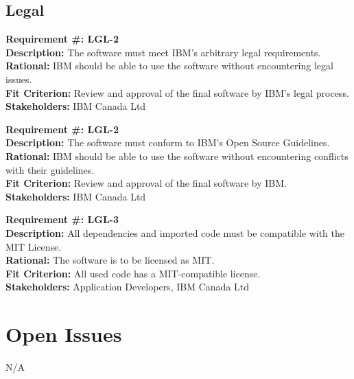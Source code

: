 \documentclass[12pt, titlepage]{article}
\begin{document}
\subsection{Legal}
\begin{flushleft}
\textbf{Requirement \#: LGL-2} \\
\textbf{Description:} The software must meet IBM's arbitrary legal requirements. \\
\textbf{Rational:} IBM should be able to use the software without encountering legal issues. \\
\textbf{Fit Criterion:} Review and approval of the final software by IBM's legal process. \\
\textbf{Stakeholders:} IBM Canada Ltd \\
\end{flushleft}
\begin{flushleft}
\textbf{Requirement \#: LGL-2} \\
\textbf{Description:} The software must conform to IBM's Open Source Guidelines. \\
\textbf{Rational:} IBM should be able to use the software without encountering conflicts with their guidelines. \\
\textbf{Fit Criterion:} Review and approval of the final software by IBM. \\
\textbf{Stakeholders:} IBM Canada Ltd \\
\end{flushleft}
\begin{flushleft}
\textbf{Requirement \#: LGL-3} \\
\textbf{Description:} All dependencies and imported code must be compatible with the MIT License. \\
\textbf{Rational:} The software is to be licensed as MIT. \\
\textbf{Fit Criterion:} All used code has a MIT-compatible license. \\
\textbf{Stakeholders:} Application Developers, IBM Canada Ltd \\
\end{flushleft}

\section{Open Issues}
N/A
\end{document}
